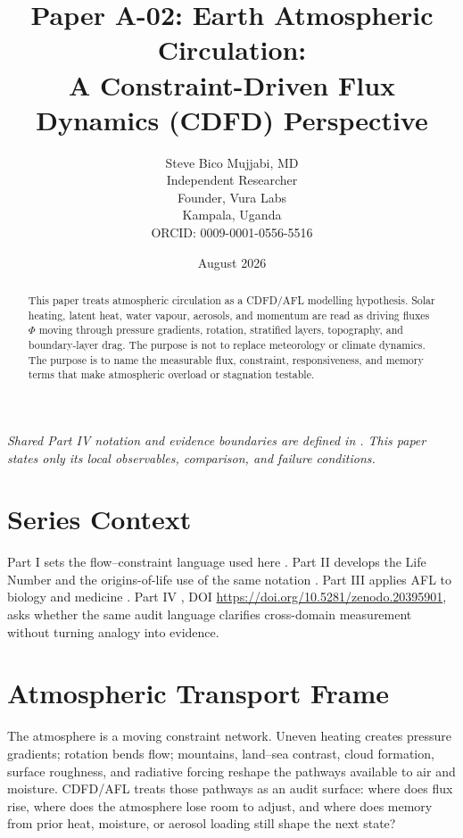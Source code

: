 \documentclass[12pt,a4paper]{article}
\title{\textbf{Paper A-02: Earth Atmospheric Circulation:\\ A Constraint-Driven Flux Dynamics (CDFD) Perspective}}
\author{Steve Bico Mujjabi, MD\\
\small Independent Researcher\\
\small Founder, Vura Labs\\
\small Kampala, Uganda\\
\small ORCID: 0009-0001-0556-5516}
\date{August 2026}
\begin{document}
\maketitle

\noindent\textit{Shared Part IV notation and evidence boundaries are defined in . This paper states only its local observables, comparison, and failure conditions.}

\begin{abstract}
This paper treats atmospheric circulation as a CDFD/AFL modelling hypothesis.
Solar heating, latent heat, water vapour, aerosols, and momentum are read as
driving fluxes $\Phi$ moving through pressure gradients, rotation, stratified
layers, topography, and boundary-layer drag. The purpose is not to replace
meteorology or climate dynamics. The purpose is to name the measurable flux,
constraint, responsiveness, and memory terms that make atmospheric overload or
stagnation testable.
\end{abstract}

\section{Series Context}

Part I sets the flow--constraint language used here \cite{MujjabiPartI2026}.
Part II develops the Life Number and the origins-of-life use of the same notation
\cite{MujjabiPartII2026}. Part III applies AFL to biology and medicine
\cite{MujjabiPartIII2026}. Part IV \cite{MujjabiPartIV2026}, DOI \url{https://doi.org/10.5281/zenodo.20395901}, asks whether the same audit language clarifies
cross-domain measurement without turning analogy into evidence.

\section{Atmospheric Transport Frame}

The atmosphere is a moving constraint network. Uneven heating creates pressure
gradients; rotation bends flow; mountains, land--sea contrast, cloud formation,
surface roughness, and radiative forcing reshape the pathways available to air
and moisture. CDFD/AFL treats those pathways as an audit surface: where does
flux rise, where does the atmosphere lose room to adjust, and where does memory
from prior heat, moisture, or aerosol loading still shape the next state?
\end{document}
